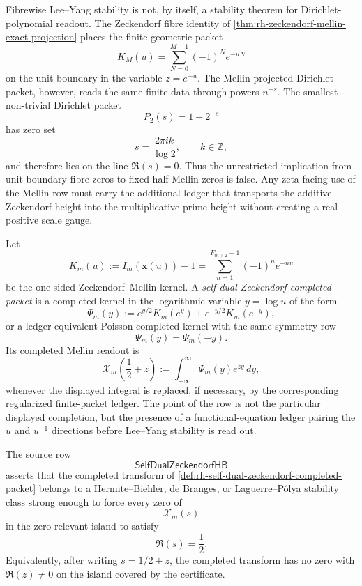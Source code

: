 \begin{principle}
\label{prin:rh-mellin-projection-obstruction}
Fibrewise Lee--Yang stability is not, by itself, a stability theorem for
Dirichlet-polynomial readout.  The Zeckendorf fibre identity of
\autoref{thm:rh-zeckendorf-mellin-exact-projection} places the finite
geometric packet
$$
K_M(u)=\sum_{N=0}^{M-1}(-1)^N e^{-uN}
$$
on the unit boundary in the variable $z=e^{-u}$.  The Mellin-projected
Dirichlet packet, however, reads the same finite data through powers
$n^{-s}$.  The smallest non-trivial Dirichlet packet
$$
P_2(s)=1-2^{-s}
$$
has zero set
$$
s=\frac{2\pi i k}{\log 2},
\qquad
k\in\mathbb Z,
$$
and therefore lies on the line $\Re(s)=0$.  Thus the unrestricted
implication from unit-boundary fibre zeros to fixed-half Mellin zeros is
false.  Any zeta-facing use of the Mellin row must carry the additional
ledger that transports the additive Zeckendorf height into the
multiplicative prime height without creating a real-positive scale
gauge.
\end{principle}

\begin{definition}
\label{def:rh-self-dual-zeckendorf-completed-packet}
Let
$$
K_m(u):=I_m(\mathbf x(u))-1
=
\sum_{n=1}^{F_{m+2}-1}(-1)^n e^{-nu}
$$
be the one-sided Zeckendorf--Mellin kernel.  A
\emph{self-dual Zeckendorf completed packet} is a completed kernel in
the logarithmic variable $y=\log u$ of the form
$$
\Psi_m(y)
:=
e^{y/2}K_m(e^y)+e^{-y/2}K_m(e^{-y}),
$$
or a ledger-equivalent Poisson-completed kernel with the same symmetry
row
$$
\Psi_m(y)=\Psi_m(-y).
$$
Its completed Mellin readout is
$$
\mathcal X_m\left(\frac12+z\right)
:=
\int_{-\infty}^{\infty}\Psi_m(y)e^{zy}\,dy,
$$
whenever the displayed integral is replaced, if necessary, by the
corresponding regularized finite-packet ledger.  The point of the row is
not the particular displayed completion, but the presence of a
functional-equation ledger pairing the $u$ and $u^{-1}$ directions before
Lee--Yang stability is read out.
\end{definition}

\begin{definition}
\label{def:rh-self-dual-zeckendorf-hb-target}
The source row
$$
\mathsf{SelfDualZeckendorfHB}
$$
asserts that the completed transform of
\autoref{def:rh-self-dual-zeckendorf-completed-packet} belongs to a
Hermite--Biehler, de Branges, or Laguerre--P\'olya stability class strong
enough to force every zero of
$$
\mathcal X_m(s)
$$
in the zero-relevant island to satisfy
$$
\Re(s)=\frac12.
$$
Equivalently, after writing $s=1/2+z$, the completed transform has no
zero with $\Re(z)\ne0$ on the island covered by the certificate.
\end{definition}


